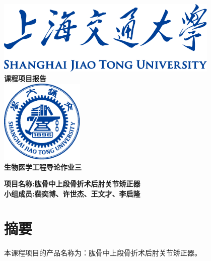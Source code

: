 \documentclass[UTF8]{ctexart}
\begin{document}
\pagestyle{fancy}

\begin{titlepage}
    \begin{center}
        \includegraphics[width=0.8\textwidth]{sjtu-name-blue.pdf}\\[1cm]
        \textsc{\huge \bfseries 课程项目报告}\\[1.5cm]
        \includegraphics[width=0.3\textwidth]{sjtu-badge-blue.pdf}\\[1cm]    
        \textsc{\huge \bfseries 生物医学工程导论作业三}\\[1.5cm]

        \begin{minipage}{0.75\textwidth}
            \begin{flushleft} 
                \LARGE \bfseries{项目名称:肱骨中上段骨折术后肘关节矫正器}\\
                \LARGE \bfseries{小组成员:裴奕博、许世杰、王文才、李启隆}
            \end{flushleft}
        \end{minipage}

    \end{center}
\end{titlepage}


\section{摘要}
    本课程项目的产品名称为：肱骨中上段骨折术后肘关节矫正器。
\end{document}
